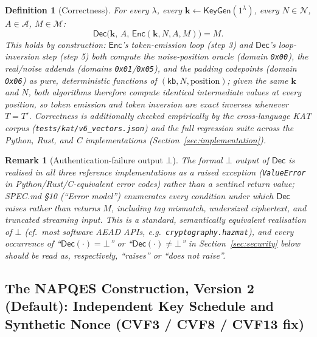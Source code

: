 \documentclass[11pt,a4paper]{article}
\newtheorem{definition}[theorem]{Definition}
\newtheorem{remark}[theorem]{Remark}
\begin{document}
\begin{definition}[Correctness]\label{def:correctness}
For every $\lambda$, every $\mathbf{k} \gets \mathsf{KeyGen}(1^{\lambda})$,
every $N\in\mathcal{N}$, $A\in\mathcal{A}$, $M\in\mathcal{M}$:
\[
  \mathsf{Dec}\bigl(\mathbf{k},\, A,\, \mathsf{Enc}(\mathbf{k}, N, A, M)\bigr) = M.
\]
This holds by construction: $\mathsf{Enc}$'s token-emission loop (step 3)
and $\mathsf{Dec}$'s loop-inversion step (step 5) both compute the
noise-position oracle (domain \texttt{0x00}), the real/noise addends
(domains \texttt{0x01}/\texttt{0x05}), and the padding codepoints (domain
\texttt{0x06}) as pure, deterministic functions of $(\mathsf{kb}, N,
\mathrm{position})$; given the same $\mathbf{k}$ and $N$, both algorithms
therefore compute identical intermediate values at every position, so
token emission and token inversion are exact inverses whenever $T = T'$.
Correctness is additionally checked empirically by the cross-language KAT
corpus (\texttt{tests/kat/v6\_vectors.json}) and the full regression suite
across the Python, Rust, and C implementations
(Section~\ref{sec:implementation}).
\end{definition}

\begin{remark}[Authentication-failure output $\bot$]
The formal $\bot$ output of $\mathsf{Dec}$ is realised in all three
reference implementations as a raised exception
(\texttt{ValueError} in Python/Rust/C-equivalent error codes) rather than a
sentinel return value; SPEC.md \S10 (``Error model'') enumerates every
condition under which $\mathsf{Dec}$ raises rather than returns $M$,
including tag mismatch, undersized ciphertext, and truncated streaming
input. This is a standard, semantically equivalent realisation of $\bot$
(cf.\ most software AEAD APIs, e.g.\ \texttt{cryptography.hazmat}), and every
occurrence of ``$\mathsf{Dec}(\cdot)=\bot$'' or
``$\mathsf{Dec}(\cdot)\neq\bot$'' in Section~\ref{sec:security} below
should be read as, respectively, ``raises'' or ``does not raise''.
\end{remark}

\subsection{The NAPQES Construction, Version 2 (Default): Independent Key Schedule and Synthetic Nonce (CVF3 / CVF8 / CVF13 fix)}
\label{sec:v8}
\end{document}
